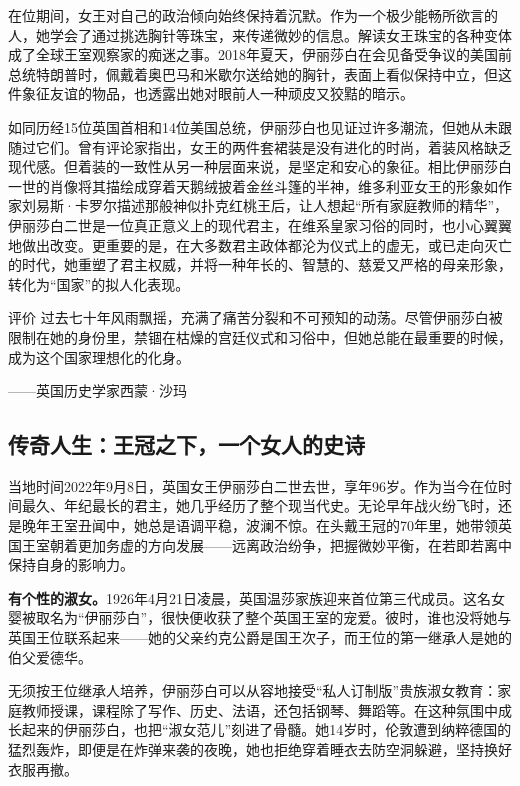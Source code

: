 在位期间，女王对自己的政治倾向始终保持着沉默。作为一个极少能畅所欲言的人，她学会了通过挑选胸针等珠宝，来传递微妙的信息。解读女王珠宝的各种变体成了全球王室观察家的痴迷之事。2018年夏天，伊丽莎白在会见备受争议的美国前总统特朗普时，佩戴着奥巴马和米歇尔送给她的胸针，表面上看似保持中立，但这件象征友谊的物品，也透露出她对眼前人一种顽皮又狡黠的暗示。

如同历经15位英国首相和14位美国总统，伊丽莎白也见证过许多潮流，但她从未跟随过它们。曾有评论家指出，女王的两件套裙装是没有进化的时尚，着装风格缺乏现代感。但着装的一致性从另一种层面来说，是坚定和安心的象征。相比伊丽莎白一世的肖像将其描绘成穿着天鹅绒披着金丝斗篷的半神，维多利亚女王的形象如作家刘易斯·卡罗尔描述那般神似扑克红桃王后，让人想起“所有家庭教师的精华”，伊丽莎白二世是一位真正意义上的现代君主，在维系皇家习俗的同时，也小心翼翼地做出改变。更重要的是，在大多数君主政体都沦为仪式上的虚无，或已走向灭亡的时代，她重塑了君主权威，并将一种年长的、智慧的、慈爱又严格的母亲形象，转化为“国家”的拟人化表现。

\begin{quoteBox}{评价}
过去七十年风雨飘摇，充满了痛苦分裂和不可预知的动荡。尽管伊丽莎白被限制在她的身份里，禁锢在枯燥的宫廷仪式和习俗中，但她总能在最重要的时候，成为这个国家理想化的化身。

——英国历史学家西蒙·沙玛
\end{quoteBox}

\subsection*{传奇人生：王冠之下，一个女人的史诗}

当地时间2022年9月8日，英国女王伊丽莎白二世去世，享年96岁。作为当今在位时间最久、年纪最长的君主，她几乎经历了整个现当代史。无论早年战火纷飞时，还是晚年王室丑闻中，她总是语调平稳，波澜不惊。在头戴王冠的70年里，她带领英国王室朝着更加务虚的方向发展——远离政治纷争，把握微妙平衡，在若即若离中保持自身的影响力。

\textbf{有个性的淑女。}1926年4月21日凌晨，英国温莎家族迎来首位第三代成员。这名女婴被取名为“伊丽莎白”，很快便收获了整个英国王室的宠爱。彼时，谁也没将她与英国王位联系起来——她的父亲约克公爵是国王次子，而王位的第一继承人是她的伯父爱德华。

无须按王位继承人培养，伊丽莎白可以从容地接受“私人订制版”贵族淑女教育：家庭教师授课，课程除了写作、历史、法语，还包括钢琴、舞蹈等。在这种氛围中成长起来的伊丽莎白，也把“淑女范儿”刻进了骨髓。她14岁时，伦敦遭到纳粹德国的猛烈轰炸，即便是在炸弹来袭的夜晚，她也拒绝穿着睡衣去防空洞躲避，坚持换好衣服再撤。

